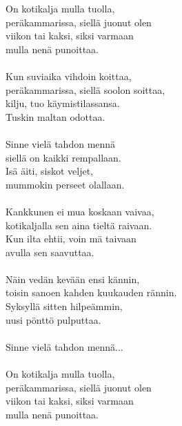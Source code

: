 
            On kotikalja mulla tuolla, \\
            peräkammarissa, siellä juonut olen \\
            viikon tai kaksi, siksi varmaan \\
            mulla nenä punoittaa. \\
\hspace{10mm} \\
            Kun suviaika vihdoin koittaa, \\
            peräkammarissa, siellä soolon soittaa, \\
            kilju, tuo käymistilassansa. \\
            Tuskin maltan odottaa. \\
\hspace{10mm} \\
            Sinne vielä tahdon mennä \\
            siellä on kaikki rempallaan. \\
            Isä äiti, siskot veljet, \\
            mummokin perseet olallaan. \\
\hspace{10mm} \\
            Kankkunen ei mua koskaan vaivaa, \\
            kotikaljalla sen aina tieltä raivaan. \\
            Kun ilta ehtii, voin mä taivaan \\
            avulla sen saavuttaa. \\
\hspace{10mm} \\
            Näin vedän kevään ensi kännin, \\
            toisin sanoen kahden kuukauden rännin. \\
            Syksyllä sitten hilpeämmin, \\
            uusi pönttö pulputtaa. \\
\hspace{10mm} \\
            Sinne vielä tahdon mennä... \\
\hspace{10mm} \\
            On kotikalja mulla tuolla, \\
            peräkammarissa, siellä juonut olen \\
            viikon tai kaksi, siksi varmaan \\
            mulla nenä punoittaa. \\
